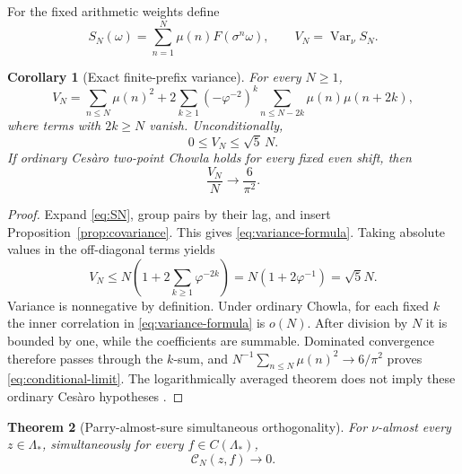 \documentclass[11pt,a4paper]{article}
\newtheorem{theorem}{Theorem}[section]
\newtheorem{corollary}[theorem]{Corollary}
\theoremstyle{remark}
\newcommand{\Mob}{\mu}
\newcommand{\Lam}{\Lambda_*}
\newcommand{\cN}{\mathcal C_N}
\newcommand{\Var}{\operatorname{Var}}
\begin{document}
For the fixed arithmetic weights define
\begin{equation}
 S_N(\omega)=\sum_{n=1}^{N}\Mob(n)F(\sigma^n\omega),
 \qquad V_N=\Var_\nu S_N.
 \label{eq:SN}
\end{equation}

\begin{corollary}[Exact finite-prefix variance]
\label{cor:variance}
For every $N\geq1$,
\begin{equation}
 V_N=\sum_{n\leq N}\Mob(n)^2
 +2\sum_{k\geq1}(-\varphi^{-2})^k
   \sum_{n\leq N-2k}\Mob(n)\Mob(n+2k),
 \label{eq:variance-formula}
\end{equation}
where terms with $2k\geq N$ vanish.  Unconditionally,
\begin{equation}
 0\leq V_N\leq\sqrt5\,N.
 \label{eq:sqrt5-bound}
\end{equation}
If ordinary Ces\`aro two-point Chowla holds for every fixed even shift, then
\begin{equation}
 \frac{V_N}{N}\longrightarrow\frac6{\pi^2}.
 \label{eq:conditional-limit}
\end{equation}
\end{corollary}

\begin{proof}
Expand \eqref{eq:SN}, group pairs by their lag, and insert
Proposition~\ref{prop:covariance}.  This gives \eqref{eq:variance-formula}.
Taking absolute values in the off-diagonal terms yields
\[
 V_N\leq N\left(1+2\sum_{k\geq1}\varphi^{-2k}\right)
 =N(1+2\varphi^{-1})=\sqrt5N.
\]
Variance is nonnegative by definition.  Under ordinary Chowla, for each
fixed $k$ the inner correlation in \eqref{eq:variance-formula} is $o(N)$.
After division by $N$ it is bounded by one, while the coefficients are
summable.  Dominated convergence therefore passes through the $k$-sum, and
$N^{-1}\sum_{n\leq N}\Mob(n)^2\to6/\pi^2$ proves
\eqref{eq:conditional-limit}.  The logarithmically averaged theorem does not
imply these ordinary Ces\`aro hypotheses \cite{Tao2016}.
\end{proof}

\begin{theorem}[Parry-almost-sure simultaneous orthogonality]
\label{thm:typical}
For $\nu$-almost every $z\in\Lam$, simultaneously for every
$f\in C(\Lam)$,
\begin{equation}
 \cN(z,f)\longrightarrow0.
 \label{eq:typical-zero}
\end{equation}
\end{theorem}
\end{document}
